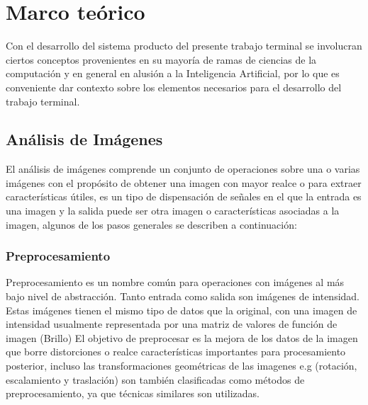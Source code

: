 \chapter{Marco teórico}
Con el desarrollo del sistema producto del presente trabajo terminal se involucran ciertos conceptos provenientes en su mayoría de ramas de ciencias de la computación y en general en alusión a la Inteligencia Artificial, por lo que es conveniente dar contexto sobre los elementos necesarios para el desarrollo del trabajo terminal.
\section{Análisis de Imágenes}
        El análisis de imágenes comprende un conjunto de operaciones sobre una o varias imágenes con el propósito de obtener una imagen con mayor realce o para extraer características útiles, es un tipo de dispensación de señales en el que la entrada es una imagen y la salida puede ser otra imagen o características asociadas a la imagen, algunos de los pasos generales se describen a continuación:
        
        \subsection{ Preprocesamiento}
            Preprocesamiento es un nombre común para operaciones con imágenes al más bajo nivel de abstracción. Tanto entrada como salida son imágenes de intensidad. Estas imágenes tienen el mismo tipo de datos que la original, con una imagen de intensidad usualmente representada por una matriz de valores de función de imagen (Brillo) El objetivo de preprocesar es la mejora de los datos de la imagen que borre distorciones o realce características importantes para procesamiento posterior, incluso las transformaciones geométricas de las imagenes e.g (rotación, escalamiento y traslación) son también clasificadas como métodos de preprocesamiento, ya que técnicas similares son utilizadas.
               
                
